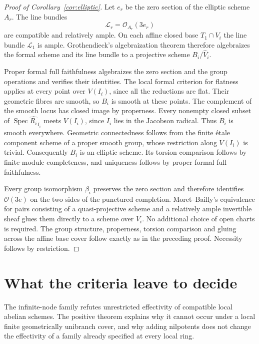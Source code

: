 \documentclass[11pt]{article}
\theoremstyle{definition}\newtheorem{definition}[theorem]{Definition}
\theoremstyle{remark}\newtheorem{remark}[theorem]{Remark}
\newcommand{\Spec}{\operatorname{Spec}}
\newcommand{\OO}{\mathcal O}
\begin{document}
\begin{proof}[Proof of Corollary~\ref{cor:elliptic}]
Let $e_r$ be the zero section of the elliptic scheme $A_r$. The line bundles
\[
 \mathcal L_r=\OO_{A_r}(3e_r)
\]
are compatible and relatively ample. On each affine closed base $T_1\cap V_i$ the line bundle $\mathcal L_1$ is ample. Grothendieck's algebraization theorem \citep[Theorem~5.4.5, pp.~157--158]{EGAIII} therefore algebraizes the formal scheme and its line bundle to a projective scheme $B_i/\widehat V_i$.

Proper formal full faithfulness algebraizes the zero section and the group operations and verifies their identities. The local formal criterion for flatness applies at every point over $V(I_i)$, since all the reductions are flat. Their geometric fibres are smooth, so $B_i$ is smooth at these points. The complement of the smooth locus has closed image by properness. Every nonempty closed subset of $\Spec\widehat{R_i}_{I_i}$ meets $V(I_i)$, since $I_i$ lies in the Jacobson radical. Thus $B_i$ is smooth everywhere. Geometric connectedness follows from the finite \'etale component scheme of a proper smooth group, whose restriction along $V(I_i)$ is trivial. Consequently $B_i$ is an elliptic scheme. Its torsion comparison follows by finite-module completeness, and uniqueness follows by proper formal full faithfulness.

Every group isomorphism $\beta_i$ preserves the zero section and therefore identifies $\OO(3e)$ on the two sides of the punctured completion. Moret--Bailly's equivalence for pairs consisting of a quasi-projective scheme and a relatively ample invertible sheaf \citep[Theorem~1.1, the category QPROJ, p.~565]{MoretBailly} glues them directly to a scheme over $V_i$. No additional choice of open charts is required. The group structure, properness, torsion comparison and gluing across the affine base cover follow exactly as in the preceding proof. Necessity follows by restriction.
\end{proof}

\section{What the criteria leave to decide}

The infinite-node family refutes unrestricted effectivity of compatible local abelian schemes. The positive theorem explains why it cannot occur under a local finite geometrically unibranch cover, and why adding nilpotents does not change the effectivity of a family already specified at every local ring.
\end{document}
